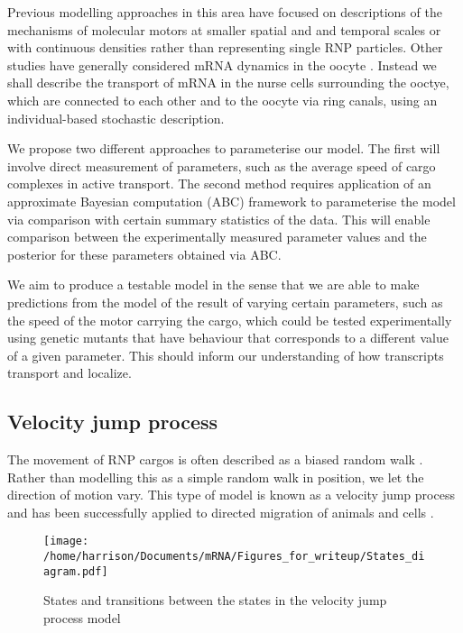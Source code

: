 \documentclass[twocolumn]{biophys}
\begin{document}
Previous modelling approaches in this area have focused on descriptions of the mechanisms of molecular motors at smaller spatial and and temporal scales \citep{bressloff2013stochastic} or with continuous densities \citep{szymanska2014mathematical} rather than representing single RNP particles.
Other studies have generally considered mRNA dynamics in the oocyte \citep{liu2011role}.
Instead we shall describe the transport of mRNA in the nurse cells surrounding the ooctye, which are connected to each other and to the oocyte via ring canals, using an individual-based stochastic description.

We propose two different approaches to parameterise our model. 
The first will involve direct measurement of parameters, such as the average speed of cargo complexes in active transport.
The second method requires application of an approximate Bayesian computation (ABC) framework \citep{johnston2014interpreting, turner2012tutorial, beaumont2002approximate} to parameterise the model via comparison with certain summary statistics of the data.
This will enable comparison between the experimentally measured parameter values and the posterior for these parameters obtained via ABC.

We aim to produce a testable model in the sense that we are able to make predictions from the model of the result of varying certain parameters, such as the speed of the motor carrying the cargo, which could be tested experimentally using genetic mutants that have behaviour that corresponds to a different value of a given parameter. 
This should inform our understanding of how transcripts transport and localize.

\subsection{Velocity jump process}
The movement of RNP cargos is often described as a biased random walk \citep{zimyanin2008vivo}. Rather than modelling this as a simple random walk in position, we let the direction of motion vary. 
This type of model is known as a velocity jump process and has been successfully applied to directed migration of animals and cells \citep{codling2005calculating, taylorking2015birds}.

\begin{figure}[h]
 \centering
 \texttt{[image: /home/harrison/Documents/mRNA/Figures\_for\_writeup/States\_diagram.pdf]}
 \caption{States and transitions between the states in the velocity jump process model}
 \label{FIG:Phases_of_motion}
\end{figure}
\end{document}
